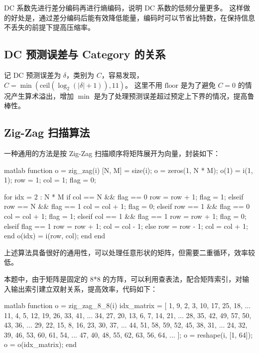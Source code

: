 \documentclass[a4paper]{article}  %
\begin{document}
DC 系数先进行差分编码再进行熵编码，说明 DC 系数的低频分量更多。
这样做的好处是，通过差分编码后能有效降低能量，编码时可以节省比特数，在保持信息不丢失的前提下提高压缩率。

\subsection{DC 预测误差与 Category 的关系}

记 DC 预测误差为 $\delta$，类别为 $C$，容易发现，$C = \min(\text{ceil}(\log_2(|\delta| + 1)), 11)$。
这里不用 $\text{floor}$ 是为了避免 $C = 0$ 的情况产生算术溢出，增加 $\min$ 是为了处理预测误差超过预定上下界的情况，提高鲁棒性。

\subsection{Zig-Zag 扫描算法}

一种通用的方法是按 Zig-Zag 扫描顺序将矩阵展开为向量，封装如下：

\begin{codeblock}{matlab}
function o = zig_zag(i)
    [N, M] = size(i);
    o = zeros(1, N * M);
    o(1) = i(1, 1);
    row = 1;
    col = 1;
    flag = 0;  %

    for idx = 2 : N * M
        if col == N && flag == 0
            row = row + 1; flag = 1;
        elseif row == N && flag == 1
            col = col + 1; flag = 0;
        elseif row == 1  && flag == 0
            col = col + 1; flag = 1;
        elseif col == 1  && flag == 1
            row = row + 1; flag = 0;
        elseif flag == 1
            row = row + 1; col = col - 1;
        else
            row = row - 1; col = col + 1;
        end
        o(idx) = i(row, col);
    end
end
\end{codeblock}

上述算法具备很好的通用性，可以处理任意形状的矩阵，但需要二重循环，效率较低。

本题中，由于矩阵是固定的 8*8 的方阵，可以利用查表法，配合矩阵索引，对输入输出索引建立双射关系，提高效率，代码如下：

\begin{codeblock}{matlab}
function o = zig_zag_8_8(i)
    idx_matrix = [
        1, 9, 2, 3, 10, 17, 25, 18, ...
        11, 4, 5, 12, 19, 26, 33, 41, ...
        34, 27, 20, 13, 6, 7, 14, 21, ...
        28, 35, 42, 49, 57, 50, 43, 36, ...
        29, 22, 15, 8, 16, 23, 30, 37, ...
        44, 51, 58, 59, 52, 45, 38, 31, ...
        24, 32, 39, 46, 53, 60, 61, 54, ...
        47, 40, 48, 55, 62, 63, 56, 64, ...
    ];
    o = reshape(i, [1, 64]);
    o = o(idx_matrix);
end
\end{codeblock}
\end{document}

